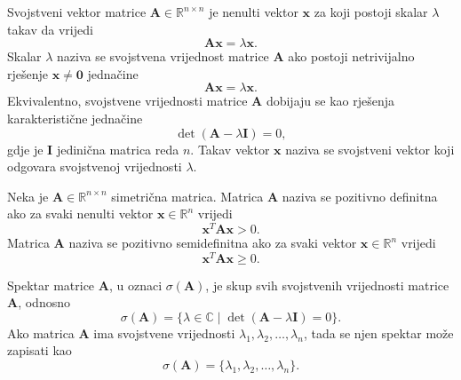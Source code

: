 \begin{definition}
Svojstveni vektor matrice \(\mathbf{A} \in \mathbb{R}^{n \times n}\) je nenulti vektor \(\mathbf{x}\) za koji postoji skalar \(\lambda\) takav da vrijedi
\begin{equation}
    \mathbf{A}\mathbf{x} = \lambda \mathbf{x}.
\end{equation}
Skalar \(\lambda\) naziva se svojstvena vrijednost matrice \(\mathbf{A}\) ako postoji netrivijalno rješenje \(\mathbf{x} \neq \mathbf{0}\) jednačine
\begin{equation}
    \mathbf{A}\mathbf{x} = \lambda \mathbf{x}.
\end{equation}
Ekvivalentno, svojstvene vrijednosti matrice \(\mathbf{A}\) dobijaju se kao rješenja karakteristične jednačine
\begin{equation}
    \det(\mathbf{A} - \lambda \mathbf{I}) = 0,
\end{equation}
gdje je \(\mathbf{I}\) jedinična matrica reda \(n\). Takav vektor \(\mathbf{x}\) naziva se svojstveni vektor koji odgovara svojstvenoj vrijednosti \(\lambda\). \cite{lay2016linear}
\end{definition}

\begin{definition}
Neka je \(\mathbf{A} \in \mathbb{R}^{n \times n}\) simetrična matrica. Matrica \(\mathbf{A}\) naziva se pozitivno definitna ako za svaki nenulti vektor \(\mathbf{x} \in \mathbb{R}^{n}\) vrijedi
\begin{equation}
    \mathbf{x}^{T}\mathbf{A}\mathbf{x} > 0.
\end{equation}
Matrica \(\mathbf{A}\) naziva se pozitivno semidefinitna ako za svaki vektor \(\mathbf{x} \in \mathbb{R}^{n}\) vrijedi
\begin{equation}
    \mathbf{x}^{T}\mathbf{A}\mathbf{x} \geq 0.
\end{equation}
\end{definition}

\begin{definition}
Spektar matrice \(\mathbf{A}\), u oznaci \(\sigma(\mathbf{A})\), je skup svih svojstvenih vrijednosti matrice \(\mathbf{A}\), odnosno
\begin{equation}
    \sigma(\mathbf{A}) = \{\lambda \in \mathbb{C} \mid \det(\mathbf{A} - \lambda \mathbf{I}) = 0\}.
\end{equation}
Ako matrica \(\mathbf{A}\) ima svojstvene vrijednosti \(\lambda_1,\lambda_2,\ldots,\lambda_n\), tada se njen spektar može zapisati kao
\begin{equation}
    \sigma(\mathbf{A}) = \{\lambda_1,\lambda_2,\ldots,\lambda_n\}.
\end{equation} \cite{brouwer2011spectra}
\end{definition}

